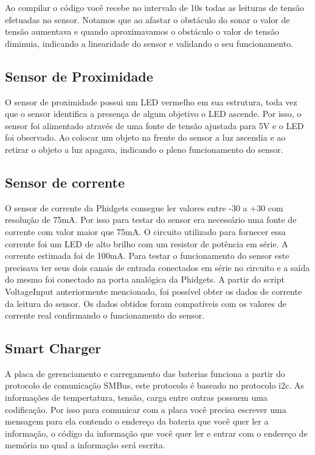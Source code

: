     Ao compilar o código você recebe no intervalo de 10s todas as leituras de tensão efetuadas no sensor. Notamos que ao afastar o obstáculo do sonar o valor de tensão aumentava e quando aproximavamos o obstáculo o valor de tensão diminuia, indicando a linearidade do sensor e validando o seu funcionamento.
    
    \subsection{Sensor de Proximidade}
    O sensor de proximidade possui um LED vermelho em sua estrutura, toda vez que o sensor identifica a presença de algum objetivo o LED ascende. Por isso, o sensor foi alimentado através de uma fonte de tensão ajustada para 5V e o LED foi observado. Ao colocar um objeto na frente do sensor a luz ascendia e ao retirar o objeto a luz apagava, indicando o pleno funcionamento do sensor.
    
    \subsection{Sensor de corrente}
    
    O sensor de corrente da Phidgets consegue ler valores entre -30 a +30 com resolução de 75mA. Por isso para testar do sensor era necessário uma fonte de corrente com valor maior que 75mA. O circuito utilizado para fornecer essa corrente foi um LED de alto brilho com um resistor de potência em série. A corrente estimada foi de 100mA. Para testar o funcionamento do sensor este precisava ter seus dois canais de entrada conectados em série no circuito e a saída do mesmo foi conectado na porta analógica da Phidgets. A partir do script VoltageInput anteriormente mencionado, foi possível obter os dados de corrente da leitura do sensor. Os dados obtidos foram compatíveis com os valores de corrente real confirmando o funcionamento do sensor. 
    

    \subsection{Smart Charger}
    
    A placa de gerenciamento e carregamento das baterias funciona a partir do protocolo de comunicação SMBus, este protocolo é baseado no protocolo i2c. As informações de tempertatura, tensão, carga entre outras possuem uma codificação. Por isso para comunicar com a placa você precisa escrever uma mensagem para ela contendo o endereço da bateria que você quer ler a informação, o código da informação que você quer ler e entrar com o endereço de memória no qual a informação será escrita.
    
